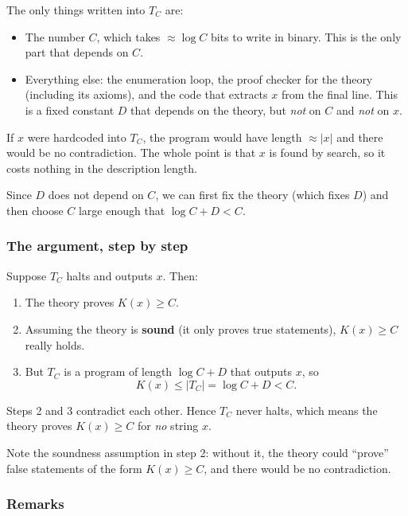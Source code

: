 \documentclass{article}
\begin{document}
The only things written into $T_C$ are:
\begin{itemize}
    \item The number $C$, which takes $\approx \log C$ bits to write in binary. This is the only part that depends on $C$.
    \item Everything else: the enumeration loop, the proof checker for the theory (including its axioms), and the code that extracts $x$ from the final line. This is a fixed constant $D$ that depends on the theory, but \emph{not} on $C$ and \emph{not} on $x$.
\end{itemize}
If $x$ were hardcoded into $T_C$, the program would have length $\approx |x|$ and there would be no contradiction. The whole point is that $x$ is found by search, so it costs nothing in the description length.

Since $D$ does not depend on $C$, we can first fix the theory (which fixes $D$) and then choose $C$ large enough that $\log C + D < C$.

\subsubsection{The argument, step by step}

Suppose $T_C$ halts and outputs $x$. Then:
\begin{enumerate}
    \item The theory proves $K(x)\geq C$.
    \item Assuming the theory is \textbf{sound} (it only proves true statements), $K(x)\geq C$ really holds.
    \item But $T_C$ is a program of length $\log C + D$ that outputs $x$, so
    \[
    K(x) \leq |T_C| = \log C + D < C.
    \]
\end{enumerate}
Steps 2 and 3 contradict each other. Hence $T_C$ never halts, which means the theory proves $K(x)\geq C$ for \emph{no} string $x$.

Note the soundness assumption in step 2: without it, the theory could ``prove'' false statements of the form $K(x)\geq C$, and there would be no contradiction.

\subsubsection{Remarks}
\end{document}
